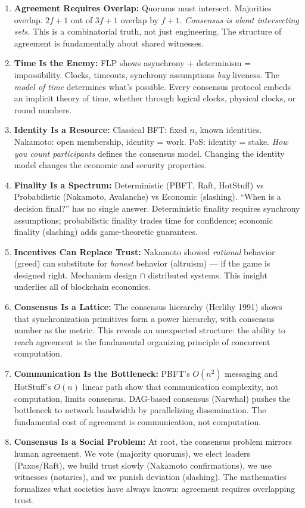 \begin{enumerate}
\item \textbf{Agreement Requires Overlap:} Quorums must intersect. Majorities overlap. $2f+1$ out of $3f+1$ overlap by $f+1$. \emph{Consensus is about intersecting sets.} This is a combinatorial truth, not just engineering. The structure of agreement is fundamentally about shared witnesses.

\item \textbf{Time Is the Enemy:} FLP shows asynchrony + determinism = impossibility. Clocks, timeouts, synchrony assumptions \emph{buy} liveness. The \emph{model of time} determines what's possible. Every consensus protocol embeds an implicit theory of time, whether through logical clocks, physical clocks, or round numbers.

\item \textbf{Identity Is a Resource:} Classical BFT: fixed $n$, known identities. Nakamoto: open membership, identity = work. PoS: identity = stake. \emph{How you count participants} defines the consensus model. Changing the identity model changes the economic and security properties.

\item \textbf{Finality Is a Spectrum:} Deterministic (PBFT, Raft, HotStuff) vs Probabilistic (Nakamoto, Avalanche) vs Economic (slashing). ``When is a decision final?'' has no single answer. Deterministic finality requires synchrony assumptions; probabilistic finality trades time for confidence; economic finality (slashing) adds game-theoretic guarantees.

\item \textbf{Incentives Can Replace Trust:} Nakamoto showed \emph{rational} behavior (greed) can substitute for \emph{honest} behavior (altruism) — if the game is designed right. Mechanism design $\cap$ distributed systems. This insight underlies all of blockchain economics.

\item \textbf{Consensus Is a Lattice:} The consensus hierarchy (Herlihy 1991) shows that synchronization primitives form a power hierarchy, with consensus number as the metric. This reveals an unexpected structure: the ability to reach agreement is the fundamental organizing principle of concurrent computation.

\item \textbf{Communication Is the Bottleneck:} PBFT's $O(n^2)$ messaging and HotStuff's $O(n)$ linear path show that communication complexity, not computation, limits consensus. DAG-based consensus (Narwhal) pushes the bottleneck to network bandwidth by parallelizing dissemination. The fundamental cost of agreement is communication, not computation.

\item \textbf{Consensus Is a Social Problem:} At root, the consensus problem mirrors human agreement. We vote (majority quorums), we elect leaders (Paxos/Raft), we build trust slowly (Nakamoto confirmations), we use witnesses (notaries), and we punish deviation (slashing). The mathematics formalizes what societies have always known: agreement requires overlapping trust.
\end{enumerate}


